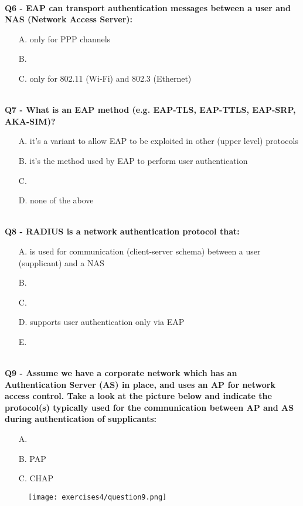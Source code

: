 \textbf{\\Q6 - EAP can transport authentication messages between a user and NAS (Network Access Server):}
\begin{itemize}
    \item[A.] only for PPP channels
    \item[B.] 
    \item[C.] only for 802.11 (Wi-Fi) and 802.3 (Ethernet)
\end{itemize}
\com{}



\textbf{\\Q7 - What is an EAP method (e.g. EAP-TLS, EAP-TTLS, EAP-SRP, AKA-SIM)?}
\begin{itemize}
    \item[A.] it's a variant to allow EAP to be exploited in other (upper level) protocols
    \item[B.] it's the method used by EAP to perform user authentication
    \item[C.] 
    \item[D.] none of the above
\end{itemize}
\com{}

\textbf{\\Q8 - RADIUS is a network authentication protocol that:}
\begin{itemize}
    \item[A.] is used for communication (client-server schema) between a user (supplicant) and a NAS
    \item[B.] 
    \item[C.] 
    \item[D.] supports user authentication only via EAP
    \item[E.] 
\end{itemize}

\textbf{\\Q9 - Assume we have a corporate network which has an Authentication Server (AS) in place, and uses an AP for network access control. 
Take a look at the picture below and indicate the protocol(s) typically used for the communication between AP and AS during authentication of supplicants:}
\begin{itemize}
    \item[A.] 
    \item[B.] PAP
    \item[C.] CHAP
\end{itemize}
\begin{figure}[h]
    \centering
    \texttt{[image: exercises4/question9.png]}
\end{figure}
\com{}


